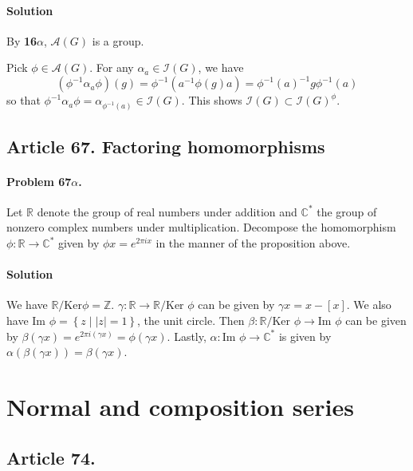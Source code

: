 \paragraph*{Solution}
By \textbf{16$\alpha$}, $\mathcal{A}(G)$ is a group.

Pick $\phi \in \mathcal{A}(G)$. For any $\alpha_a \in \mathcal{I}(G)$,
we have
$$ (\phi^{-1} \alpha_a \phi)(g) = \phi^{-1}(a^{-1}\phi(g)a)
= \phi^{-1}(a)^{-1} g \phi^{-1}(a) $$
so that $\phi^{-1} \alpha_a \phi = \alpha_{\phi^{-1}(a)} \in \mathcal{I}(G)$.
This shows $\mathcal{I}(G) \subset \mathcal{I}(G)^\phi$.

\subsection{Article 67. Factoring homomorphisms}

\paragraph{Problem 67$\alpha$.}
Let $\mathbb{R}$ denote the group of real numbers under addition and
$\mathbb{C}^*$ the group of nonzero complex numbers under multiplication.
Decompose the homomorphism $ \phi : \mathbb{R} \rightarrow \mathbb{C}^*$
given by $\phi x = e^{2 \pi i x}$ in the manner of the proposition above.

\paragraph*{Solution}
We have $\mathbb{R} / \mbox{Ker} \phi = \mathbb{Z}$. $\gamma : \mathbb{R} \rightarrow
\mathbb{R} / \mbox{Ker } \phi $ can be given by $ \gamma x = x - [x] $. We also
have $ \mbox{Im } \phi = \left\{ z \mid |z| = 1\right\}$, the unit circle. Then
$\beta : \mathbb{R} / \mbox{Ker } \phi \rightarrow \mbox{Im } \phi $ can be
given by $ \beta (\gamma x) = e^{2\pi i (\gamma x)} = \phi (\gamma x)$.
Lastly, $\alpha : \mbox{Im } \phi \rightarrow \mathbb{C}^* $ is given by
$ \alpha ( \beta ( \gamma x ) ) = \beta (\gamma x) $.

\section{Normal and composition series}

\subsection{Article 74.}

